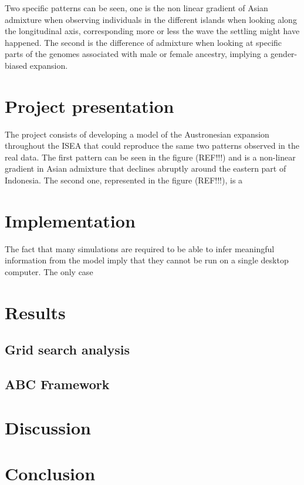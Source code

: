 \documentclass[a4paper,11pt]{report}
\begin{document}
Two specific patterns can be seen, one is the non linear gradient of Asian admixture when observing individuals in the different islands when looking along the longitudinal axis, corresponding more or less the wave the settling might have happened. The second is the difference of admixture when looking at specific parts of the genomes associated with male or female ancestry, implying a gender-biased expansion.


\chapter{Project presentation}
The project consists of developing a model of the Austronesian expansion throughout the ISEA that could reproduce the same two patterns observed in the real data.
The first pattern can be seen in the figure (REF!!!) and is a non-linear gradient in Asian admixture that declines abruptly around the eastern part of Indonesia. The second one, represented in the figure (REF!!!), is a 


\chapter{Implementation}

The fact that many simulations are required to be able to infer meaningful information from the model imply that they cannot be run on a single desktop computer. The only case



\chapter{Results}
\section{Grid search analysis}


\section{ABC Framework}


\chapter{Discussion}


\chapter*{Conclusion}



\end{document}
